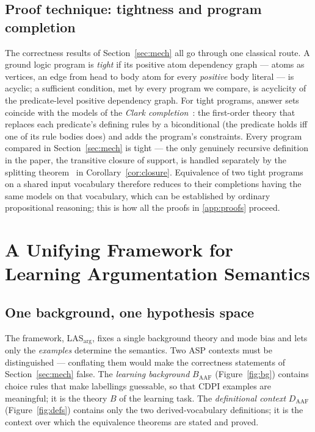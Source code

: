 \documentclass[review,12pt]{elsarticle}
\theoremstyle{definition}
\theoremstyle{remark}
\newcommand{\Daaf}{D_{\mathrm{AAF}}}
\begin{document}
\subsection{Proof technique: tightness and program completion}
\label{sec:bg-verif}

The correctness results of Section~\ref{sec:mech} all go through one classical
route. A ground logic program is \emph{tight} if its positive atom
dependency graph --- atoms as vertices, an edge from head to body atom for
every \emph{positive} body literal --- is acyclic; a sufficient condition,
met by every program we compare, is acyclicity of the predicate-level positive
dependency graph. For tight programs, answer sets
coincide with the models of the \emph{Clark
completion}~\citep{clark1978,fages1994,erdem2003}: the first-order theory that
replaces each predicate's defining rules by a biconditional (the predicate
holds iff one of its rule bodies does) and adds the program's constraints.
Every program compared in Section~\ref{sec:mech} is tight --- the only genuinely
recursive definition in the paper, the transitive closure of support, is
handled separately by the splitting theorem~\citep{lifschitz1994} in
Corollary~\ref{cor:closure}. Equivalence of two tight programs on a shared
input vocabulary therefore reduces to their completions having the same
models on that vocabulary, which can be established by ordinary propositional
reasoning; this is how all the proofs in \ref{app:proofs} proceed.

\section{A Unifying Framework for Learning Argumentation Semantics}
\label{sec:framework}

\subsection{One background, one hypothesis space}
\label{sec:unified}

The framework, LAS$_{\text{arg}}$, fixes a single background theory and mode
bias and lets only the \emph{examples} determine the semantics. Two ASP
contexts must be distinguished --- conflating them would make the correctness
statements of Section~\ref{sec:mech} false. The \emph{learning background}
$B_{\mathrm{AAF}}$ (Figure~\ref{fig:bg}) contains choice rules that make
labellings guessable, so that CDPI examples are meaningful; it is the theory
$B$ of the learning task. The \emph{definitional context} $\Daaf$
(Figure~\ref{fig:defs}) contains only the two derived-vocabulary definitions;
it is the context over which the equivalence theorems are stated and proved.
\end{document}
